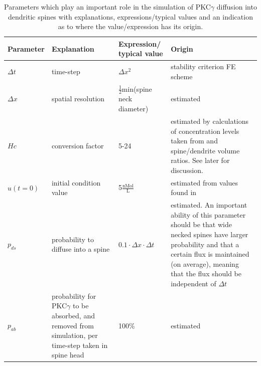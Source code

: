  \begin{table}[H]
\centering
\begin{tabular}{|p{}|p{}|p{}|p{}|}
\hline
\textbf{Parameter} & \textbf{Explanation} &\textbf{Expression/ typical value}& \textbf{Origin} \\
\hline
$\Delta t$ & time-step & $\Delta x^2$ & stability criterion FE scheme \\
\hline
$\Delta x$ & spatial resolution & $\frac{1}{2}$min(spine neck diameter) & estimated \\
\hline
$Hc$ & conversion factor & 5-24 & estimated by calculations of concentration levels taken from \cite{light1996protein} and spine/dendrite volume ratios. See later for discussion. \\
\hline
$u(t=0)$ & initial condition value & 5$\frac{\text{nMol}}{\text{L}}$ & estimated from values found in \cite{light1996protein}\\
\hline
$p_{ds}$ & probability to diffuse into a spine & $0.1\cdot\Delta x\cdot\Delta t$& estimated. An important ability of this parameter should be that wide necked spines have larger probability and that a certain flux is maintained (on average), meaning that the flux should be independent of $\Delta t$ \\
\hline
$p_{ab}$ & probability for PKC$\gamma$ to be absorbed, and removed from simulation, per time-step taken in spine head & 100\% & estimated\\
\hline
\end{tabular}
\caption[Important parameters]{Parameters which play an important role in the simulation of PKC$\gamma$ diffusion into dendritic spines with explanations, expressions/typical values and an indication as to where the value/expression has its origin.}
\label{table:parameters}
\end{table}
